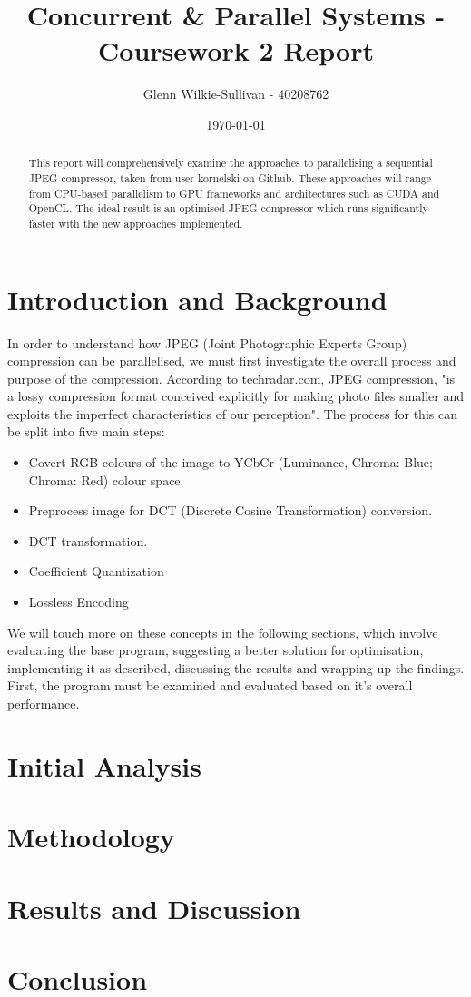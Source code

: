 \documentclass[12pt, a4paper]{article}
\title{\vspace{-3cm}Concurrent \& Parallel Systems - Coursework 2 Report}
\author{Glenn Wilkie-Sullivan - 40208762}
\date{\today}
\begin{document}
\maketitle

\begin{abstract}
\noindent This report will comprehensively examine the approaches to parallelising a sequential JPEG compressor, taken from user kornelski on Github. These approaches will range from CPU-based parallelism to GPU frameworks and architectures such as CUDA and OpenCL. The ideal result is an optimised JPEG compressor which runs significantly faster with the new approaches implemented.
\end{abstract}

\section{Introduction and Background}
In order to understand how JPEG (Joint Photographic Experts Group) compression can be parallelised, we must first investigate the overall process and purpose of the compression. According to techradar.com,  JPEG compression, "is a lossy compression format conceived explicitly for making photo files smaller and exploits the imperfect characteristics of our perception". The process for this can be split into five main steps:

\begin{itemize}
\item Covert RGB colours of the image to YCbCr (Luminance, Chroma: Blue; Chroma: Red) colour space.
\item Preprocess image for DCT (Discrete Cosine Transformation) conversion.
\item DCT transformation.
\item Coefficient Quantization
\item Lossless Encoding
\end{itemize}

We will touch more on these concepts in the following sections, which involve evaluating the base program, suggesting a better solution for optimisation, implementing it as described, discussing the results and wrapping up the findings. First, the program must be examined and evaluated based on it's overall performance.

\section{Initial Analysis}


\section{Methodology}

\section{Results and Discussion}

\section{Conclusion}

\newpage


{}
\nocite{*}
\end{document}
